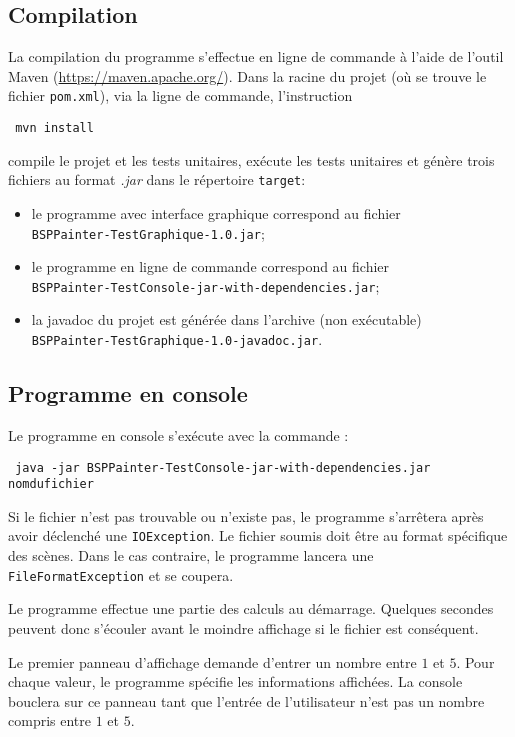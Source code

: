 \subsection{Compilation}
La compilation du programme s'effectue en ligne de commande à l'aide
de l'outil Maven (\url{https://maven.apache.org/}). Dans la racine
du projet (où se trouve le fichier \texttt{pom.xml}),
via la ligne de commande, l'instruction
\begin{center}
  \texttt{
    mvn install
  }
\end{center}
compile le projet et les tests unitaires, exécute les tests unitaires
et génère trois fichiers au format \emph{.jar} dans le répertoire
\texttt{target}:
\begin{itemize}
\item le programme avec interface graphique correspond au fichier
  \\ \texttt{BSPPainter-TestGraphique-1.0.jar};
\item le programme en ligne de commande correspond au fichier
  \\ \texttt{BSPPainter-TestConsole-jar-with-dependencies.jar};
\item la javadoc du projet est générée dans l'archive (non exécutable)
  \\ \texttt{BSPPainter-TestGraphique-1.0-javadoc.jar}.
\end{itemize}

\subsection{Programme en console}
Le programme en console s'exécute avec la commande :
\begin{center}
  \texttt{
    java -jar BSPPainter-TestConsole-jar-with-dependencies.jar nomdufichier
  }
\end{center}

Si le fichier n'est pas trouvable ou n'existe pas, le programme
s'arrêtera après avoir déclenché une \texttt{IOException}.
Le fichier soumis doit être au format spécifique des scènes.
Dans le cas contraire, le programme lancera une \texttt{FileFormatException}
et se coupera.

Le programme effectue une partie des calculs au démarrage.
Quelques secondes peuvent donc s'écouler avant le moindre affichage
si le fichier est conséquent.

Le premier panneau d'affichage demande d'entrer un
nombre entre $1$ et $5$. Pour chaque valeur, le programme
spécifie les informations affichées.
La console bouclera sur ce panneau tant que
l'entrée de l'utilisateur n'est pas un nombre
compris entre $1$ et $5$.

